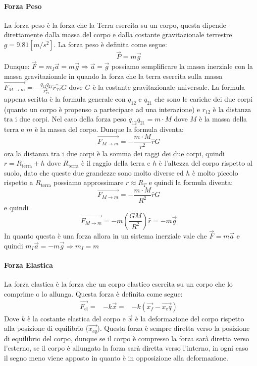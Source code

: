     \paragraph{Forza Peso} La forza peso è la forza che la Terra esercita su un corpo, questa dipende direttamente dalla massa del corpo e dalla costante gravitazionale terrestre $g=9.81 [m/s^2]$. La forza peso è definita come segue: $$
        \vec{P} = m\vec{g}
    $$
    Dunque: $ \vec{F} = m_I \vec{a} = m \vec{g} \Rightarrow \vec{a} = \vec{g} $ possiamo semplificare la massa inerziale con la massa gravitazionale in quando la forza che la terra esercita sulla massa $\vec{F_{M\rightarrow m}} = -\frac{q_{12}q_{21}}{r^2_{12}} \hat{r_{12}} G$ dove $G$ è la costante gravitazionale universale. La formula appena scritta è la formula generale con $q_{12}$ e $q_{21}$ che sono le cariche dei due corpi (quanto un corpo è propenso a partecipare ad una interazione) e $r_{12}$ è la distanza tra i due corpi. Nel caso della forza peso $q_{12}q_{21} = m\cdot M$ dove $M$ è la massa della terra e $m$ è la massa del corpo. Dunque la formula diventa: $$
        \vec{F_{M\rightarrow m}} = -\frac{m\cdot M}{r^2} \hat{r} G
    $$ ora la distanza tra i due corpi è la somma dei raggi dei due corpi, quindi $r = R_{\text{terra}} + h$ dove $R_{\text{terra}}$ è il raggio della terra e $h$ è l'altezza del corpo rispetto al suolo, dato che queste due grandezze sono molto diverse ed $h$ è molto piccolo rispetto a $R_{\text{terra}}$ possiamo approssimare $r \approx R_T$ e quindi la formula diventa: $$
        \vec{F_{M\rightarrow m}} = -\frac{m\cdot M}{R^2} \hat{r} G
    $$
    e quindi $$
        \vec{F_{M\rightarrow m}} = -m\left(\frac{GM}{R^2}\right) \hat{r} = -m\vec{g}
    $$ In quanto questa è una forza allora in un sistema inerziale vale che $\vec{F}=m\vec{a}$ e quindi $m_I\vec{a} = -m\vec{g} \Rightarrow m_I = m$
    \paragraph{Forza Elastica}  
        La forza elastica è la forza che un corpo elastico esercita su un corpo che lo comprime o lo allunga. Questa forza è definita come segue: $$
            \begin{aligned}
                \vec{F_{\text{el}}} =& -k\vec{x}
                =& -k(\vec{x_f} - \vec{x_eq})
            \end{aligned}
        $$
        Dove $k$ è la costante elastica del corpo e $\vec{x}$ è la deformazione del corpo rispetto alla posizione di equilibrio ($\vec{x_{eq}}$). Questa forza è sempre diretta verso la posizione di equilibrio del corpo, dunque se il corpo è compresso la forza sarà diretta verso l'esterno, se il corpo è allungato la forza sarà diretta verso l'interno, in ogni caso il segno meno viene apposto in quanto è in opposizione alla deformazione.
